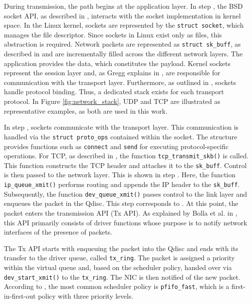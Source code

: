 During transmission, the path begins at the application layer.
In step , the BSD socket API, as described in \cite{bsd}, interacts with the socket implementation in kernel space.
In the Linux kernel, sockets are represented by the \texttt{struct socket}, which manages the file descriptor.
Since sockets in Linux exist only as files, this abstraction is required.
Network packets are represented as \texttt{struct sk\_buff}, as described in \cite{arnout} and are incrementally filled across the different network layers.
The application provides the data, which constitutes the payload.
Kernel sockets represent the session layer and, as Gregg explains in \cite[Chap. 10.4.3]{Gregg_2020a}, are responsible for communication with the transport layer.
Furthermore, as outlined in \cite[p. 153]{FREITAS2022148}, sockets handle protocol binding.
Thus, a dedicated stack exists for each transport protocol.
In Figure \ref{fig:network_stack}, \ac{UDP} and \ac{TCP} are illustrated as representative examples, as both are used in this work.

In step , sockets communicate with the transport layer.
This communication is handled via the \texttt{struct proto\_ops} contained within the socket.
The structure provides functions such as \texttt{connect} and \texttt{send} for executing protocol-specific operations.
For \ac{TCP}, as described in \cite{arnout}, the function \texttt{tcp\_transmit\_skb()} is called.
This function constructs the \ac{TCP} header and attaches it to the \texttt{sk\_buff}.
Control is then passed to the network layer.
This is shown in step .
Here, the function \texttt{ip\_queue\_xmit()} performs routing and appends the IP header to the \texttt{sk\_buff}.
Subsequently, the function \texttt{dev\_queue\_xmit()} passes control to the link layer and enqueues the packet in the \ac{Qdisc}.
This step corresponds to .
At this point, the packet enters the transmission API (Tx API).
As explained by Bolla et al. in \cite[p. 5]{tx_napi}, this API primarily consists of driver functions whose purpose is to notify network interfaces of the presence of packets.

The Tx API starts with enqueuing the packet into the \ac{Qdisc} and ends with its transfer to the driver queue, called \texttt{tx\_ring}.
The packet is assigned a priority within the virtual queue and, based on the scheduler policy, handed over via \texttt{dev\_start\_xmit()} to the \texttt{tx\_ring}.
The \ac{NIC} is then notified of the new packet.
According to \cite{arnout}, the most common scheduler policy is \texttt{pfifo\_fast}, which is a first-in-first-out policy with three priority levels.

